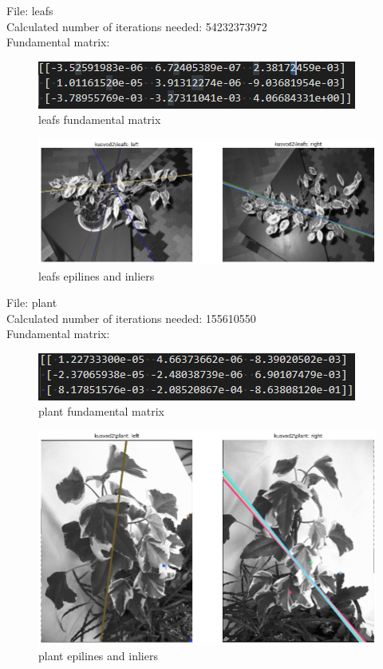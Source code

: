 \documentclass[10pt,a4paper]{article}
\begin{document}
File: leafs\\
Calculated number of iterations needed: 54232373972\\
Fundamental matrix:
\begin{figure}[H]
	\centering
	\includegraphics[width=0.7\linewidth]{img/leafsf}
	\caption{leafs fundamental matrix}
	\label{fig:leafsf}
\end{figure}
\begin{figure}[H]
	\centering
	\includegraphics[width=0.7\linewidth]{img/leafs}
	\caption{leafs epilines and inliers}
	\label{fig:leafs}
\end{figure}

File: plant\\
Calculated number of iterations needed: 155610550\\
Fundamental matrix:
\begin{figure}[H]
	\centering
	\includegraphics[width=0.7\linewidth]{img/plantf}
	\caption{plant fundamental matrix}
	\label{fig:plantf}
\end{figure}
\begin{figure}[H]
	\centering
	\includegraphics[width=0.7\linewidth]{img/plant}
	\caption{plant epilines and inliers}
	\label{fig:plant}
\end{figure}
\end{document}
